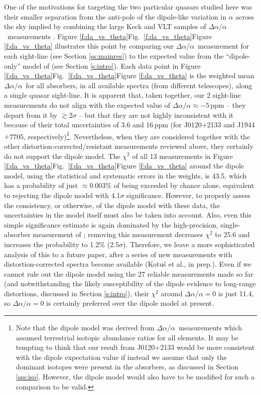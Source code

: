 \documentclass[fleqn,usenatbib,usedcolumn]{mnras}
\renewcommand{\la}{\lesssim} %
\renewcommand{\ga}{\gtrsim} %
\newcommand{\Sref}[1]{Section \ref{#1}}
\newcommand{\Fref}[1]{\ifhmode \ifnum\spacefactor=1001 Figure \ref{#1}\else Fig.\ \ref{#1}\fi \else Figure \ref{#1}\fi}
\newcommand{\daa}{\ensuremath{\Delta\alpha/\alpha}}
\begin{document}
One of the motivations for targeting the two particular quasars studied here was their smaller separation from the anti-pole of the dipole-like variation in $\alpha$ across the sky implied by combining the large Keck and VLT samples of \daa\ measurements \citep{Webb:2011:191101,King:2012:3370}. \Fref{f:da_vs_theta} illustrates this point by comparing our \daa\ measurement for each sight-line (see \Sref{ss:mainres}) to the expected value from the ``dipole-only'' model of \citet{King:2012:3370} (see \Sref{s:intro}). Each data point in \Fref{f:da_vs_theta} is the weighted mean \daa\ for all absorbers, in all available spectra (from different telescopes), along a single quasar sight-line. It is apparent that, taken together, our 2 sight-line measurements do not align with the expected value of $\daa\approx-5$\,ppm -- they depart from it by $\ga$2$\sigma$ -- but that they are not highly inconsistent with it because of their total uncertainties of 3.6 and 16\,ppm (for J0120$+$2133 and J1944$+$7705, respectively)\footnote{Note that the dipole model was derived from \daa\ measurements which assumed terrestrial isotopic abundance ratios for all elements. It may be tempting to think that our result from J0120$+$2133 would be more consistent with the dipole expectation value if instead we assume that only the dominant isotopes were present in the absorbers, as discussed in \Sref{sss:iso}. However, the dipole model would also have to be modified for such a comparison to be valid.}. Nevertheless, when they are considered together with the other distortion-corrected/resistant measurements reviewed above, they certainly do not support the dipole model. The $\chi^2$ of all 13 measurements in \Fref{f:da_vs_theta} around the dipole model, using the statistical and systematic errors in the weights, is 43.5, which has a probability of just $\approx$0.003\% of being exceeded by chance alone, equivalent to rejecting the dipole model with 4.1$\sigma$ significance. However, to properly assess the consistency, or otherwise, of the dipole model with these data, the uncertainties in the model itself must also be taken into account. Also, even this simple significance estimate is again dominated by the high-precision, single-absorber measurement of \citet{Kotus:2017:3679}; removing this measurement decreases $\chi^2$ to 25.6 and increases the probability to 1.2\% (2.5$\sigma$). Therefore, we leave a more sophisticated analysis of this to a future paper, after a series of new measurements with distortion-corrected spectra become available (Kotu\v{s} et al., in prep.). Even if we cannot rule out the dipole model using the 27 reliable measurements made so far (and notwithstanding the likely susceptibility of the dipole evidence to long-range distortions, discussed in \Sref{s:intro}), their $\chi^2$ around $\daa=0$ is just 11.4, so $\daa=0$ is certainly preferred over the dipole model at present.
\end{document}

